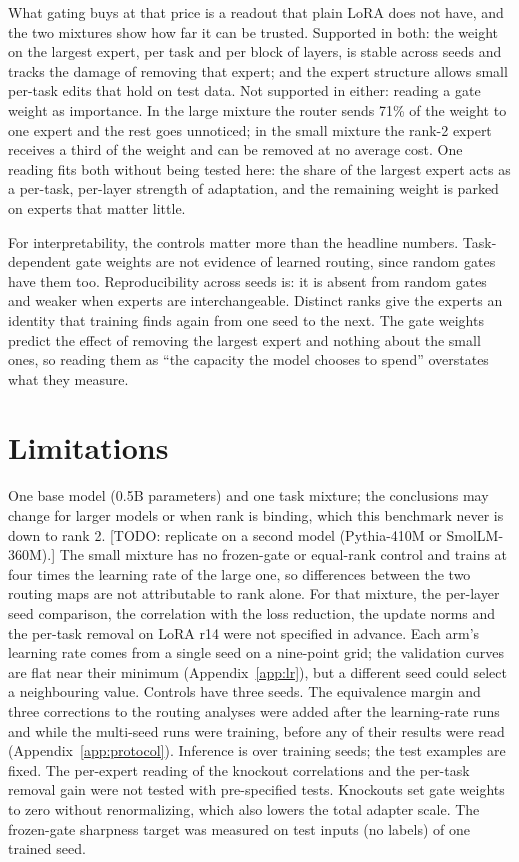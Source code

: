 \documentclass[11pt]{article}
\newcommand{\todo}[1]{\textcolor{red!70!black}{[TODO: #1]}}
\begin{document}
What gating buys at that price is a readout that plain LoRA does not have, and the two mixtures
show how far it can be trusted. Supported in both: the weight on the largest expert, per task
and per block of layers, is stable across seeds and tracks the damage of removing that expert;
and the expert structure allows small per-task edits that hold on test data. Not supported in
either: reading a gate weight as importance. In the large mixture the router sends 71\% of the
weight to one expert and the rest goes unnoticed; in the small mixture the rank-2 expert
receives a third of the weight and can be removed at no average cost. One reading fits both
without being tested here: the share of the largest expert acts as a per-task, per-layer
strength of adaptation, and the remaining weight is parked on experts that matter little.

For interpretability, the controls matter more than the headline numbers. Task-dependent gate
weights are not evidence of learned routing, since random gates have them too. Reproducibility
across seeds is: it is absent from random gates and weaker when experts are interchangeable.
Distinct ranks give the experts an identity that training finds again from one seed to the next.
The gate weights predict the effect of removing the largest expert and nothing about the small
ones, so reading them as ``the capacity the model chooses to spend'' overstates what they
measure.

\section{Limitations}
One base model (0.5B parameters) and one task mixture; the conclusions may change for larger
models or when rank is binding, which this benchmark never is down to rank 2.
\todo{replicate on a second model (Pythia-410M or SmolLM-360M).} The small mixture has no
frozen-gate or equal-rank control and trains at four times the learning rate of the large one,
so differences between the two routing maps are not attributable to rank alone. For that
mixture, the per-layer seed comparison, the correlation with the loss reduction, the update
norms and the per-task removal on LoRA r14 were not specified in advance.
Each arm's learning rate comes from a single seed on a nine-point grid; the validation curves are
flat near their minimum (Appendix~\ref{app:lr}), but a different seed could select a neighbouring
value. Controls have three seeds. The equivalence margin and three corrections to the routing
analyses were added after the learning-rate runs and while the multi-seed runs were training,
before any of their results were read (Appendix~\ref{app:protocol}). Inference is over training
seeds; the test examples are fixed. The per-expert reading of the knockout correlations and the
per-task removal gain were not tested with pre-specified tests. Knockouts set gate weights to
zero without renormalizing, which also lowers the total adapter scale. The frozen-gate sharpness
target was measured on test inputs (no labels) of one trained seed.
\end{document}
